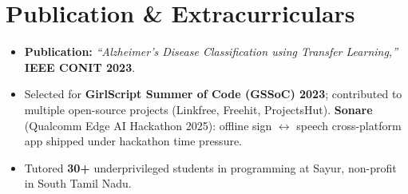 \documentclass[letterpaper,10pt]{article}
\begin{document}
\section{Publication \& Extracurriculars}
\begin{itemize}[leftmargin=0.18in, itemsep=0pt, topsep=1pt]
  \item\small \textbf{Publication:} \textit{``Alzheimer's Disease Classification using Transfer Learning,''} \textbf{IEEE CONIT 2023}.
  \item\small Selected for \textbf{GirlScript Summer of Code (GSSoC) 2023}; contributed to multiple open-source projects (Linkfree, Freehit, ProjectsHut). \textbf{Sonare} (Qualcomm Edge AI Hackathon 2025): offline sign $\leftrightarrow$ speech cross-platform app shipped under hackathon time pressure.
  \item\small Tutored \textbf{30+} underprivileged students in programming at Sayur, non-profit in South Tamil Nadu.
\end{itemize}
\vspace{-6pt}
\end{document}
